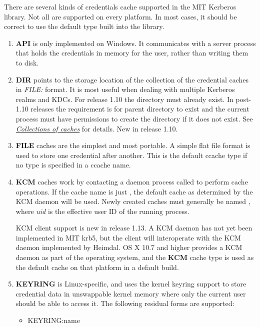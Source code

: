 \documentclass[letterpaper,10pt,english]{sphinxmanual}
\begin{document}
There are several kinds of credentials cache supported in the MIT
Kerberos library.  Not all are supported on every platform.  In most
cases, it should be correct to use the default type built into the
library.
\begin{enumerate}
\item {} 
\textbf{API} is only implemented on Windows.  It communicates with a
server process that holds the credentials in memory for the user,
rather than writing them to disk.

\item {} 
\textbf{DIR} points to the storage location of the collection of the
credential caches in \emph{FILE:} format. It is most useful when dealing
with multiple Kerberos realms and KDCs.  For release 1.10 the
directory must already exist.  In post-1.10 releases the
requirement is for parent directory to exist and the current
process must have permissions to create the directory if it does
not exist. See {\hyperref[basic/ccache_def:col-ccache]{\emph{Collections of caches}}} for details.  New in release 1.10.

\item {} 
\textbf{FILE} caches are the simplest and most portable. A simple flat
file format is used to store one credential after another.  This is
the default ccache type if no type is specified in a ccache name.

\item {} 
\textbf{KCM} caches work by contacting a daemon process called 
to perform cache operations.  If the cache name is just ,
the default cache as determined by the KCM daemon will be used.
Newly created caches must generally be named ,
where \emph{uid} is the effective user ID of the running process.

KCM client support is new in release 1.13.  A KCM daemon has not
yet been implemented in MIT krb5, but the client will interoperate
with the KCM daemon implemented by Heimdal.  OS X 10.7 and higher
provides a KCM daemon as part of the operating system, and the
\textbf{KCM} cache type is used as the default cache on that platform in
a default build.

\item {} 
\textbf{KEYRING} is Linux-specific, and uses the kernel keyring support
to store credential data in unswappable kernel memory where only
the current user should be able to access it.  The following
residual forms are supported:
\begin{itemize}
\item {} 
KEYRING:name


\end{itemize}
\end{enumerate}
\end{document}
